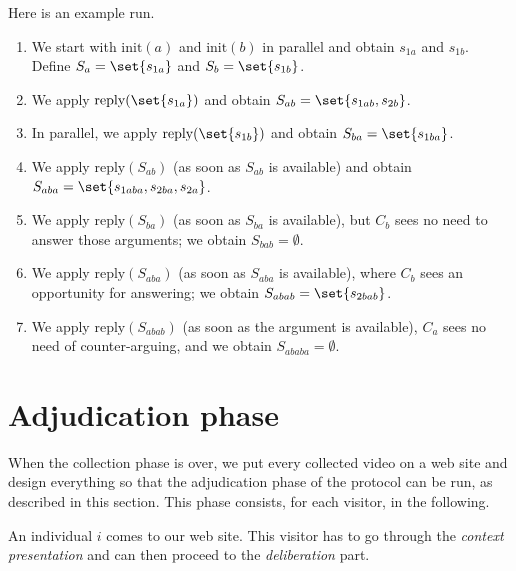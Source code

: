 \documentclass[version=3.21, pagesize, twoside=off, bibliography=totoc, DIV=calc, fontsize=12pt, a4paper]{scrartcl}
\begin{document}
\begin{example}
Here is an example run.
\begin{enumerate}
	\item We start with $\text{init}(a)$ and $\text{init}(b)$ in parallel and obtain $s_{1a}$ and $s_{1b}$. Define $S_{a} = \set{s_{1a}}$ and $S_{b} = \set{s_{1b}}$.
	\item We apply $\text{reply}(\set{s_{1a}})$ and obtain $S_{ab} = \set{s_{1ab}, s_{2b}}$.
	\item In parallel, we apply $\text{reply}(\set{s_{1b}})$ and obtain $S_{ba} = \set{s_{1ba}}$.
	\item We apply $\text{reply}(S_{ab})$ (as soon as $S_{ab}$ is available) and obtain $S_{aba} = \set{s_{1aba}, s_{2ba}, s_{2a}}$.
	\item We apply $\text{reply}(S_{ba})$ (as soon as $S_{ba}$ is available), but $C_b$ sees no need to answer those arguments; we obtain $S_{bab} = \emptyset$.
	\item We apply $\text{reply}(S_{aba})$ (as soon as $S_{aba}$ is available), where $C_b$ sees an opportunity for answering; we obtain $S_{abab} = \set{s_{2bab}}$.
	\item We apply $\text{reply}(S_{abab})$ (as soon as the argument is available), $C_a$ sees no need of counter-arguing, and we obtain $S_{ababa} = \emptyset$.
\end{enumerate}
\end{example}

\section{Adjudication phase}
When the collection phase is over, we put every collected video on a web site and design everything so that the adjudication phase of the protocol can be run, as described in this section. This phase consists, for each visitor, in the following.

An individual $i$ comes to our web site. This visitor has to go through the \emph{context presentation} and can then proceed to the \emph{deliberation} part.
\end{document}
